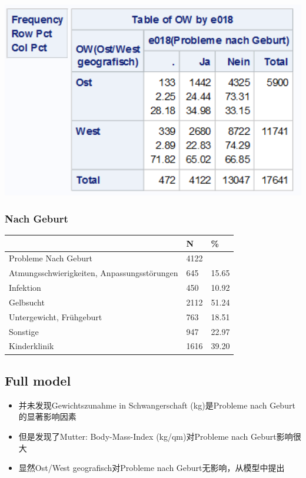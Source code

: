 \documentclass[
  10pt,
]{article}
\providecommand{\tightlist}{%
  \setlength{\itemsep}{0pt}\setlength{\parskip}{0pt}}
\begin{document}
\includegraphics[width=5.57in]{./Yimeng_Plots/M7_0e}

\hypertarget{nach-geburt}{%
\subsubsection{Nach Geburt}\label{nach-geburt}}

\begin{longtable}[]{@{}lll@{}}
\toprule
& N & \% \\
\midrule
\endhead
Probleme Nach Geburt & 4122 & \\
Atmungsschwierigkeiten, Anpassungsstörungen & 645 & 15.65 \\
Infektion & 450 & 10.92 \\
Gelbsucht & 2112 & 51.24 \\
Untergewicht, Frühgeburt & 763 & 18.51 \\
Sonstige & 947 & 22.97 \\
Kinderklinik & 1616 & 39.20 \\
\bottomrule
\end{longtable}

\hypertarget{full-model}{%
\subsection{Full model}\label{full-model}}

\begin{itemize}
\tightlist
\item
  并未发现Gewichtszunahme in Schwangerschaft (kg)是Probleme nach
  Geburt的显著影响因素
\item
  但是发现了Mutter: Body-Mass-Index (kg/qm)对Probleme nach
  Geburt影响很大
\item
  显然Ost/West geografisch对Probleme nach Geburt无影响，从模型中提出
\end{itemize}
\end{document}
